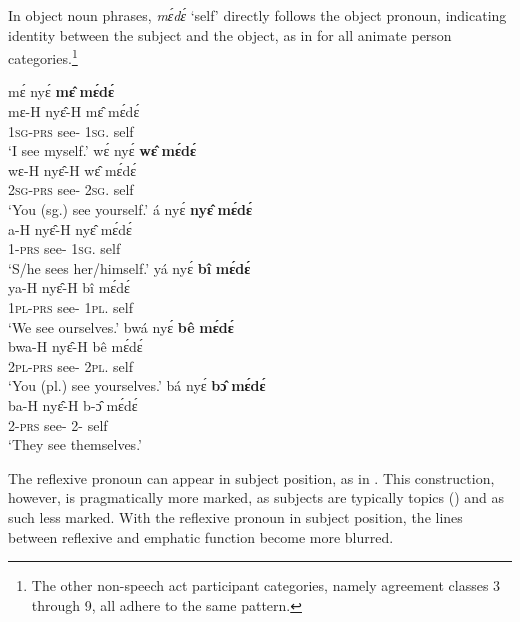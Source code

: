In object noun phrases, {\itshape mɛ́dɛ́} `self' directly follows the object pronoun, indicating identity between the subject and the object, as in  for all animate person categories.\footnote{The other non-speech act participant categories, namely agreement classes 3 through 9, all adhere to the same pattern.}

\ea \label{mede}
  \ea \label{medea}
  \glll  mɛ́ nyɛ́ {\bfseries mɛ̂} {\bfseries mɛ́dɛ́} \\
          mɛ-H nyɛ̂-H mɛ̂ mɛ́dɛ́   \\
          1\textsc{sg}-\textsc{prs} see-{\R} 1\textsc{sg}.{\OBJ} self   \\
    \trans `I see myself.'
\ex\label{medeb}
  \glll  wɛ́ nyɛ́ {\bfseries wɛ̂} {\bfseries mɛ́dɛ́} \\
          wɛ-H nyɛ̂-H wɛ̂ mɛ́dɛ́   \\
          2\textsc{sg}-\textsc{prs} see-{\R} 2\textsc{sg}.{\OBJ} self   \\
    \trans `You (sg.) see yourself.'
\ex\label{medec}
  \glll  á nyɛ́ {\bfseries nyɛ̂} {\bfseries mɛ́dɛ́} \\
          a-H nyɛ̂-H nyɛ̂ mɛ́dɛ́   \\
          1-\textsc{prs} see-{\R} 1\textsc{sg}.{\OBJ} self   \\
    \trans `S/he sees her/himself.'
\ex\label{meded}
  \glll  yá nyɛ́ {\bfseries bî} {\bfseries mɛ́dɛ́} \\
          ya-H nyɛ̂-H bî mɛ́dɛ́   \\
          1\textsc{pl}-\textsc{prs} see-{\R} 1\textsc{pl}.{\OBJ} self   \\
    \trans `We see ourselves.'
\ex\label{medee}
  \glll  bwá nyɛ́ {\bfseries bê} {\bfseries mɛ́dɛ́} \\
          bwa-H nyɛ̂-H bê mɛ́dɛ́   \\
          2\textsc{pl}-\textsc{prs} see-{\R} 2\textsc{pl}.{\OBJ} self   \\
    \trans `You (pl.) see yourselves.'
\ex\label{medef}
  \glll  bá nyɛ́ {\bfseries bɔ̂} {\bfseries mɛ́dɛ́} \\
          ba-H nyɛ̂-H b-ɔ̂ mɛ́dɛ́   \\
          2-\textsc{prs} see-{\R} 2-{\OBJ} self   \\
    \trans `They see themselves.'
\z
\z


The reflexive pronoun can appear in subject position, as in . This construction, however, is pragmatically more marked, as subjects are typically topics () and as such less marked. With the reflexive pronoun in subject position, the lines between reflexive and emphatic function become more blurred. 

